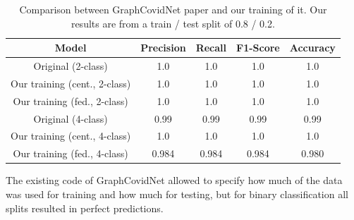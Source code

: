 \begin{table}[htbp]
    \small
    \centering
    \caption{Comparison between GraphCovidNet paper\cite{graph_covid_net} and our training of it. Our results are from a train / test split of 0.8 / 0.2.}
    \begin{tabular}{c|c|c|c|c}
        Model & Precision & Recall & F1-Score & Accuracy \\
        \hline
        Original (2-class) & 1.0 & 1.0 & 1.0 & 1.0\\
        Our training (cent., 2-class) & 1.0 & 1.0 & 1.0 & 1.0\\
        Our training (fed., 2-class) & 1.0 & 1.0 & 1.0 & 1.0\\
        Original (4-class) & 0.99 & 0.99 & 0.99 & 0.99\\
        Our training (cent., 4-class) & 1.0 & 1.0 & 1.0 & 1.0\\
        Our training (fed., 4-class) & 0.984 & 0.984 & 0.984 & 0.980\\
    \end{tabular}
    \label{tab:results_graphcovidnet}
\end{table}

The existing code of GraphCovidNet allowed to specify how much of the data was used for training and how much for testing, but for binary classification all splits resulted in perfect predictions.

